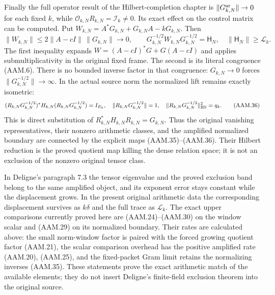 Finally the full operator result of the Hilbert-completion chapter
is $\|G_{k,N}^{\rm ar}\|\to0$ for each fixed $k$, while
$\mathcal O_{k,N}R_{k,N}=\mathcal I_k\ne0$. Its exact effect
on the control matrix can be computed. Put
$W_{k,N}=A^*G_{k,N}+G_{k,N}A-kG_{k,N}$. Then
\[
 \|W_{k,N}\|\leq2\|A-cI\|\,\|G_{k,N}\|\longrightarrow0,
 \qquad
 G_{k,N}^{-1/2}W_{k,N}G_{k,N}^{-1/2}=\mathsf H_N,
 \quad\|\mathsf H_N\|\geq\mathcal L_k.
 \tag{AAM.35}
\]
The first inequality expands $W=(A-cI)^*G+G(A-cI)$ and applies
submultiplicativity in the original fixed frame. The second is its
literal congruence (AAM.6). There is no bounded inverse factor in
that congruence: $G_{k,N}\to0$ forces
$\|G_{k,N}^{-1/2}\|\to\infty$.
In the actual source norm the normalized lift remains exactly
isometric:
\[
 (R_{k,N}G_{k,N}^{-1/2})^*H_{k,N}
        (R_{k,N}G_{k,N}^{-1/2})=I_{E_k},
 \quad \|R_{k,N}G_{k,N}^{-1/2}\|=1,
 \quad \|R_{k,N}G_{k,N}^{-1/2}\|_{\rm HS}^2=q_k.
 \tag{AAM.36}
\]
This is direct substitution of $R_{k,N}^*H_{k,N}R_{k,N}=G_{k,N}$.
Thus the original vanishing representatives, their nonzero arithmetic
classes, and the amplified normalized boundary are connected by the
explicit maps (AAM.35)--(AAM.36). Their Hilbert reduction is the
proved quotient map killing the dense relation space; it is not an
exclusion of the nonzero original tensor class.

In Deligne's paragraph 7.3 the tensor eigenvalue and the proved
exclusion band belong to the same amplified object, and its exponent
error stays constant while the displacement grows. In the present
original arithmetic data the corresponding displacement survives
as $k\delta$ and the full trace as $\mathcal L_k$. The exact
upper comparisons currently proved here are (AAM.24)--(AAM.30)
on the window scalar and (AAM.29) on its normalized boundary.
Their rates are calculated above: the small norm-window factor is
paired with the forced growing quotient factor (AAM.21), the
scalar comparison overhead has the positive amplified rate
(AAM.20), (AAM.25), and the fixed-packet Gram limit retains the
normalizing inverses (AAM.35). These statements prove the exact
arithmetic match of the available elements; they do not insert
Deligne's finite-field exclusion theorem into the original source.
